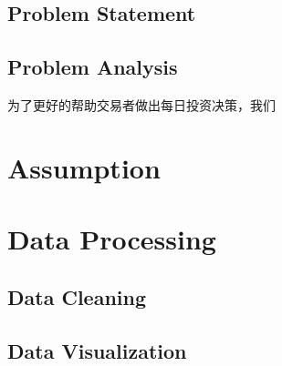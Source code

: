 \documentclass{mcmthesis}
\begin{document}
\subsection{Problem Statement}


\subsection{Problem Analysis}
为了更好的帮助交易者做出每日投资决策，我们



\iffalse
\begin{itemize}
\item the angular velocity of the bat,
\item the velocity of the ball, and
\item the position of impact along the bat.
\end{itemize}

\begin{Theorem} \label{thm:latex}
\LaTeX
\end{Theorem}
\begin{Lemma} \label{thm:tex}
\TeX .
\end{Lemma}
\begin{proof}
The proof of theorem.
\end{proof}

\begin{itemize}
\item
\item
\item
\item
\end{itemize}
\fi


\section{Assumption}



\section{Data Processing}
\subsection{Data Cleaning}

\subsection{Data Visualization}
\end{document}
